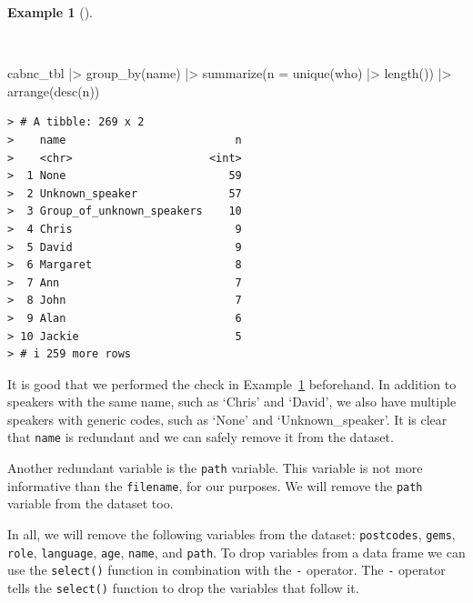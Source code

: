 \documentclass[
  letterpaper,
  DIV=11,
  numbers=noendperiod]{scrreport}
\newenvironment{Shaded}{\begin{snugshade}}{\end{snugshade}}
\newcommand{\AttributeTok}[1]{\textcolor[rgb]{0.00,0.00,0.00}{#1}}
\newcommand{\FunctionTok}[1]{\textcolor[rgb]{0.00,0.00,0.00}{#1}}
\newcommand{\NormalTok}[1]{\textcolor[rgb]{0.00,0.00,0.00}{#1}}
\newcommand{\SpecialCharTok}[1]{\textcolor[rgb]{0.00,0.00,0.00}{#1}}
\theoremstyle{definition}
\newtheorem{example}{Example}[chapter]
\theoremstyle{remark}
\begin{document}
\begin{example}[]\protect\hypertarget{exm-cd-cabnc-who-name}{}\label{exm-cd-cabnc-who-name}

~

\begin{Shaded}
\begin{Highlighting}[]
\NormalTok{cabnc\_tbl }\SpecialCharTok{|\textgreater{}}
  \FunctionTok{group\_by}\NormalTok{(name) }\SpecialCharTok{|\textgreater{}}
  \FunctionTok{summarize}\NormalTok{(}\AttributeTok{n =} \FunctionTok{unique}\NormalTok{(who) }\SpecialCharTok{|\textgreater{}} \FunctionTok{length}\NormalTok{()) }\SpecialCharTok{|\textgreater{}}
  \FunctionTok{arrange}\NormalTok{(}\FunctionTok{desc}\NormalTok{(n))}
\end{Highlighting}
\end{Shaded}

\begin{verbatim}
> # A tibble: 269 x 2
>    name                          n
>    <chr>                     <int>
>  1 None                         59
>  2 Unknown_speaker              57
>  3 Group_of_unknown_speakers    10
>  4 Chris                         9
>  5 David                         9
>  6 Margaret                      8
>  7 Ann                           7
>  8 John                          7
>  9 Alan                          6
> 10 Jackie                        5
> # i 259 more rows
\end{verbatim}

\end{example}

It is good that we performed the check in
Example~\ref{exm-cd-cabnc-who-name} beforehand. In addition to speakers
with the same name, such as `Chris' and `David', we also have multiple
speakers with generic codes, such as `None' and `Unknown\_speaker'. It
is clear that \texttt{name} is redundant and we can safely remove it
from the dataset.

Another redundant variable is the \texttt{path} variable. This variable
is not more informative than the \texttt{filename}, for our purposes. We
will remove the \texttt{path} variable from the dataset too.

In all, we will remove the following variables from the dataset:
\texttt{postcodes}, \texttt{gems}, \texttt{role}, \texttt{language},
\texttt{age}, \texttt{name}, and \texttt{path}. To drop variables from a
data frame we can use the \texttt{select()} function in combination with
the \texttt{-} operator. The \texttt{-} operator tells the
\texttt{select()} function to drop the variables that follow it.
\end{document}
